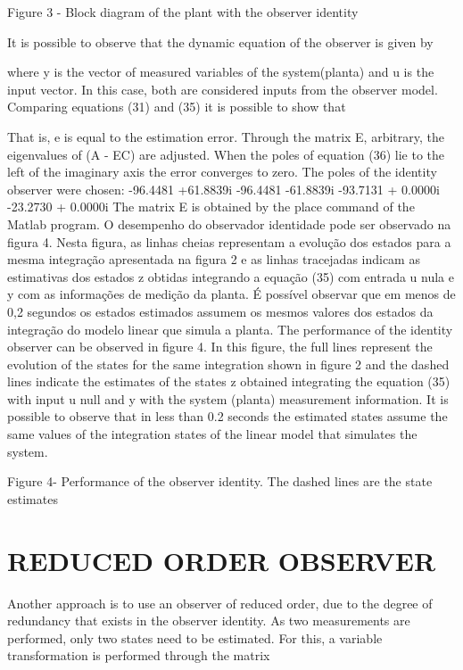 \documentclass[sublist,a4paper,twoside,11pt]{article}
\begin{document}
Figure 3 - Block diagram of the plant with the observer identity

It is possible to observe that the dynamic equation of the observer is given by

where y is the vector of measured variables of the system(planta) and u is the input vector. In this case, both are considered inputs from the observer model.
Comparing equations (31) and (35) it is possible to show that


That is, e is equal to the estimation error. Through the matrix E, arbitrary, the eigenvalues of (A - EC) are adjusted. When the poles of equation (36) lie to the left of the imaginary axis the error converges to zero. The poles of the identity observer were chosen:
-96.4481 +61.8839i
-96.4481 -61.8839i
-93.7131 + 0.0000i
-23.2730 + 0.0000i
The matrix E is obtained by the place command of the Matlab program.
O desempenho do observador identidade pode ser observado na figura 4. Nesta figura, as linhas cheias representam a evolução dos estados para a mesma integração apresentada na  figura 2 e as linhas tracejadas indicam as estimativas dos estados z obtidas integrando a equação (35) com entrada u nula e y com as informações de medição da planta. É possível observar que em menos de 0,2 segundos os estados estimados assumem os mesmos valores dos estados da integração do modelo linear que simula a planta.	The performance of the identity observer can be observed in figure 4. In this figure, the full lines represent the evolution of the states for the same integration shown in figure 2 and the dashed lines indicate the estimates of the states z obtained integrating the equation (35) with input u null and y with the system (planta) measurement information. It is possible to observe that in less than 0.2 seconds the estimated states assume the same values of the integration states of the linear model that simulates the system.


Figure 4- Performance of the observer identity. The dashed lines are the state estimates


\section{REDUCED ORDER OBSERVER}
Another approach is to use an observer of reduced order, due to the degree of redundancy that exists in the observer identity. As two measurements are performed, only two states need to be estimated. For this, a variable transformation is performed through the matrix
\end{document}
